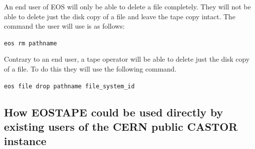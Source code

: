 \documentclass{article}
\begin{document}
An end user of EOS will only be able to delete a file completely.  They will not be able to delete just the disk copy of a file and leave the tape copy intact.  The command the user will use is as follows:

\texttt{eos rm pathname}

Contrary to an end user, a tape operator will be able to delete just the disk copy of a file.  To do this they will use the following command.

\texttt{eos file drop pathname file\_system\_id}

\subsection{How EOSTAPE could be used directly by existing users of the CERN public CASTOR instance}
\end{document}
